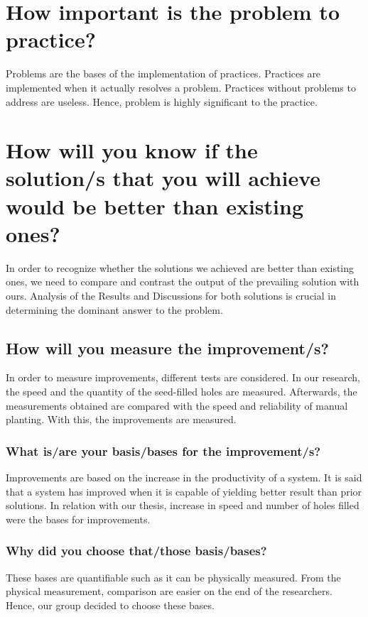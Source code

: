 \section{How important is the problem to practice?}

Problems are the bases of the implementation of practices. Practices are implemented when it actually resolves a problem. Practices without problems to address are useless. Hence, problem is highly significant to the practice.

\section{How will you know if the solution/s that you will achieve would be better than existing ones?}

In order to recognize whether the solutions we achieved are better than existing ones, we need to compare and contrast the output of the prevailing solution with ours. Analysis of the Results and Discussions for both solutions is crucial in determining the dominant answer to the problem.

		\subsection{How will you measure the improvement/s?}
			In order to measure improvements, different tests are considered. In our research, the speed and the quantity of the seed-filled holes are measured. Afterwards, the measurements obtained are compared with the speed and reliability of manual planting. With this, the improvements are measured.
	
		\subsubsection{What is/are your basis/bases for the improvement/s?}
		Improvements are based on the increase in the productivity of a system. It is said that a system has improved when it is capable of yielding better result than prior solutions. In relation with our thesis, increase in speed and number of holes filled were the bases for improvements.

		\subsubsection{Why did you choose that/those basis/bases?}
		These bases are quantifiable such as it can be physically measured. From the physical measurement, comparison are easier on the end of the researchers. Hence, our group decided to choose these bases.
				
